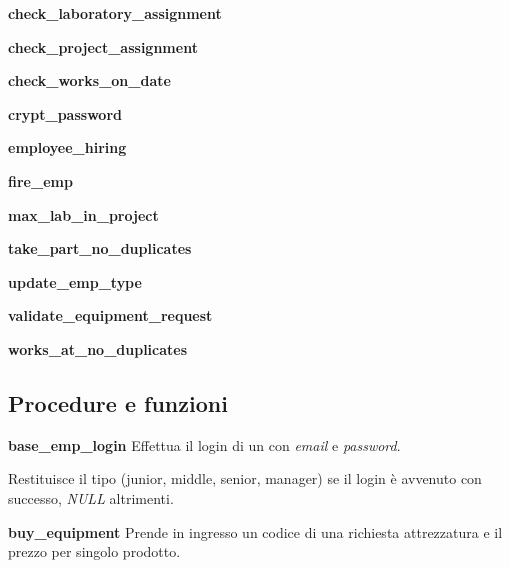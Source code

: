 \noindent \textbf{check\_laboratory\_assignment}
\bigskip

\noindent \textbf{check\_project\_assignment}
\bigskip

\noindent \textbf{check\_works\_on\_date}
\bigskip

\noindent \textbf{crypt\_password}
\bigskip

\noindent \textbf{employee\_hiring}
\bigskip

\noindent \textbf{fire\_emp}
\bigskip

\noindent \textbf{max\_lab\_in\_project}
\bigskip

\noindent \textbf{take\_part\_no\_duplicates}
\bigskip

\noindent \textbf{update\_emp\_type}
\bigskip

\noindent \textbf{validate\_equipment\_request}
\bigskip

\noindent \textbf{works\_at\_no\_duplicates}


\subsection{Procedure e funzioni}
\noindent \textbf{base\_emp\_login}\sskip
Effettua il login di un \textit{\baseemp} con \textit{email} e \textit{password}.

Restituisce il tipo (junior, middle, senior, manager) se il login è avvenuto con successo, \textit{NULL} altrimenti.
\bigskip

\noindent \textbf{buy\_equipment}\sskip
Prende in ingresso un codice di una richiesta attrezzatura e il prezzo per singolo prodotto.

